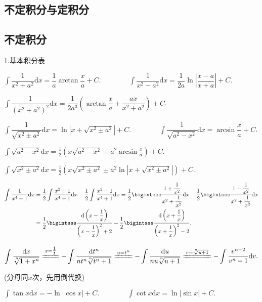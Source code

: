 \documentclass[UTF8]{ctexart}
\newcommand\dif{\mathrm{d}}
\newcommand\no{\noindent}
\newcommand\dis{\displaystyle}
\newcommand\intd{\dis\int}
\begin{document}
\begin{spacing}{2}
\newpage

\section{不定积分与定积分}

\subsection{不定积分}

\no1.基本积分表

\begin{spacing}{3}
$\intd\dfrac{1}{x^2+a^2}\dif x=\dfrac{1}{a}\arctan \dfrac{x}{a}+C.
\qquad\qquad
\intd\dfrac{1}{x^2-a^2}\dif x=\dfrac{1}{2a}\ln\left| \dfrac{x-a}{x+a}\right|+C$.

$\intd\dfrac{1}{(x^2+a^2)^2}\dif x=\dfrac{1}{2a^3}\left(\arctan \dfrac{x}{a}
+\dfrac{ax}{x^2+a^2}\right)+C$.

$\intd\dfrac{1}{\sqrt{x^2\pm a^2}}\dif x=\ln \left|x+\sqrt{x^2\pm a^2}\right|+C.
\qquad\qquad
\intd\dfrac{1}{\sqrt{a^2- x^2}}\dif x=\arcsin \dfrac{x}{a}+C$.

$\intd\sqrt{a^2-x^2}\dif x=\frac{1}{2}\left(x\sqrt{a^2-x^2}+a^2
\arcsin\frac{x}{a}\right)+C$.

$\intd\sqrt{x^2\pm a^2}\dif x=\frac{1}{2}\left(x\sqrt{x^2\pm a^2}\pm a^2
\ln\left|x+\sqrt{x^2\pm a^2}\right| \right)+C$.

$\begin{aligned}
\intd\frac{1}{x^4+1}\dif x&=\frac{1}{2}\intd\frac{x^2+1}{x^4+1}\dif x-
\frac{1}{2}\intd\frac{x^2-1}{x^4+1}\dif x
=\frac{1}{2}\dis\bigintsss\frac{1+\dfrac{1}{x^2}}{x^2+\dfrac{1}{x^2}}\dif x
-\frac{1}{2}\bigintsss\frac{1-\dfrac{1}{x^2}}{x^2+\dfrac{1}{x^2}}\dif x \\
&=\frac{1}{2}\bigintsss\frac{\dif \left(x-\dfrac{1}{x}\right)}{\left(x-\dfrac{1}{x}\right)^2+2}
-\frac{1}{2}\bigintsss\frac{\dif \left(x+\dfrac{1}{x}\right)}{\left(x+\dfrac{1}{x}\right)^2-2}.
\end{aligned}$

\vspace{0.4cm}

$\intd\frac{\dif x}{\sqrt[^n\!]{1+x^n}}\xlongequal{x=\tfrac{1}{t}}
-\intd\frac{\dif t^n}{nt^n\sqrt[^n\!]{t^n+1}}\xlongequal{u=t^n}
-\intd\frac{\dif u}{nu\sqrt[^n\!]{u+1}}\xlongequal{v=\sqrt[^n\!]{u+1}}
-\intd\frac{v^{n-2}}{v^n-1}\dif v.$

(分母同$x$次，先用倒代换)

$\intd\tan x\dif x=-\ln|\cos x|+C.
\qquad\qquad
\intd\cot x\dif x=\ln|\sin x|+C.$


\end{spacing}
\end{spacing}
\end{document}
